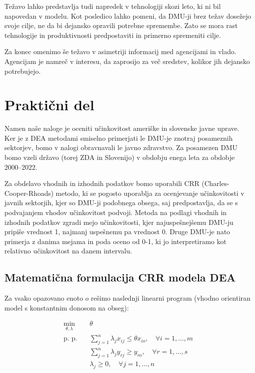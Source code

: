 \documentclass[12pt,a4paper]{article}
\theoremstyle{definition}
\begin{document}
Težavo lahko predstavlja tudi napredek v tehnologiji
skozi leto, ki ni bil napovedan v modelu. Kot posledico
lahko pomeni, da DMU-ji brez težav dosežejo svoje cilje,
ne da bi dejansko opravili potrebne spremembe. Zato se
mora rast tehnologije in produktivnosti predpostaviti 
in primerno spremeniti cilje.

Za konec omenimo še težavo v asimetriji informacij med
agencijami in vlado. Agencijam je namreč v interesu,
da zaprosijo za več sredstev, kolikor jih dejansko 
potrebujejo. 

\section{Praktični del}

Namen naše naloge je oceniti učinkovitost ameriške in slovenske
javne uprave. Ker je z DEA metodami smiselno
primerjati le DMU-je znotraj posameznih sektorjev, bomo v nalogi obravnavali le
javno zdravstvo. Za posamezen DMU bomo vzeli državo (torej ZDA in Slovenijo) v obdobju 
enega leta za obdobje 2000--2022. 

Za obdelavo vhodnih in izhodnih podatkov bomo uporabili CRR 
(Charles-Cooper-Rhoads) metodo, ki se pogosto uporablja za 
ocenjevanje učinkovitosti v javnih sektorjih, kjer so DMU-ji podobnega obsega, saj 
predpostavlja, da se s podvajanjem vhodov učinkovitost podvoji. 
Metoda na podlagi vhodnih in izhodnih podatkov zgradi mejo učinkovitosti, kjer najuspešnejšemu DMU-ju pripiše vrednost 1,
najmanj uspešnemu pa vrednost 0. Druge DMU-je nato primerja z danima mejama in poda oceno od 0-1, ki jo
interpretiramo kot relativno učinkovitost na danem intervalu.

\subsection{Matematična formulacija CRR modela DEA}

Za vsako opazovano enoto \( o \) rešimo naslednji linearni program (vhodno orientiran model s konstantnim donosom na obseg):

\begin{align*}
\min_{\theta, \lambda} \quad & \theta \\
\text{p. p.} \quad 
& \sum_{j=1}^{n} \lambda_j x_{ij} \leq \theta x_{io}, \quad \forall i = 1, \dots, m \\
& \sum_{j=1}^{n} \lambda_j y_{rj} \geq y_{ro}, \quad \forall r = 1, \dots, s \\
& \lambda_j \geq 0, \quad \forall j = 1, \dots, n
\end{align*}
\end{document}
